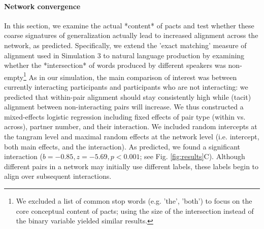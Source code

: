 \paragraph{Network convergence }

In this section, we examine the actual *content* of pacts and test whether these coarse signatures of generalization actually lead to increased alignment across the network, as predicted. 
Specifically, we extend the 'exact matching' measure of alignment used in Simulation 3 to natural language production by examining whether the *intersection* of words produced by different speakers was non-empty\footnote{We excluded a list of common stop words (e.g. 'the', 'both') to focus on the core conceptual content of pacts; using the size of the intersection instead of the binary variable yielded similar results.}
As in our simulation, the main comparison of interest was between currently interacting participants and participants who are not interacting: we predicted that within-pair alignment should stay consistently high while (tacit) alignment between non-interacting pairs will increase. 
We thus constructed a mixed-effects logistic regression including fixed effects of pair type (within vs. across), partner number, and their interaction.
We included random intercepts at the tangram level and maximal random effects at the network level (i.e. intercept, both main effects, and the interaction).
As predicted, we found a significant interaction ($b = -0.85, z = -5.69, p < 0.001$; see Fig. \ref{fig:results}C).
Although different pairs in a network may initially use different labels, these labels begin to align over subsequent interactions. 
